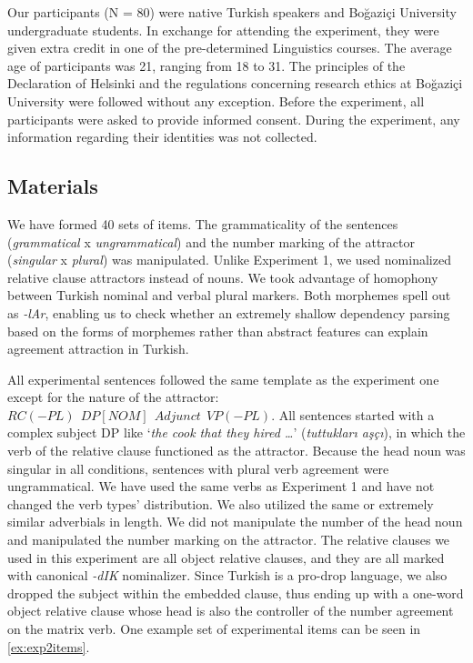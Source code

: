Our participants (N = 80) were native Turkish speakers and Bo\u{g}azi\c{c}i University undergraduate students. In exchange for attending the experiment, they were given extra credit in one of the pre-determined Linguistics courses. The average age of participants was 21, ranging from 18 to 31. The principles of the Declaration of Helsinki and the regulations concerning research ethics at Bo\u{g}azi\c{c}i University were followed without any exception. Before the experiment, all participants were asked to provide informed consent. During the experiment, any information regarding their identities was not collected. 


\subsection{Materials}

We have formed 40 sets of items. The grammaticality of the sentences (\textit{grammatical} x \textit{ungrammatical}) and the number marking of the attractor (\textit{singular} x \textit{plural}) was manipulated. Unlike Experiment 1, we used nominalized relative clause attractors instead of nouns. We took advantage of homophony between Turkish nominal and verbal plural markers. Both morphemes spell out as \textit{-lAr}, enabling us to check whether an extremely shallow dependency parsing based on the forms of morphemes rather than abstract features can explain agreement attraction in Turkish.

All experimental sentences followed the same template as the experiment one except for the nature of the attractor: $RC(-PL){\ }{\ }DP[NOM]{\ }{\ }Adjunct{\ }{\ }VP(-PL)$. All sentences started with a complex subject DP like `\textit{the cook that they hired \ldots{}}' (\textit{tuttuklar{\i} a\c{s}\c{c}{\i}}), in which the verb of the relative clause functioned as the attractor. Because the head noun was singular in all conditions, sentences with plural verb agreement were ungrammatical. We have used the same verbs as Experiment 1 and have not changed the verb types' distribution. We also utilized the same or extremely similar adverbials in length. We did not manipulate the number of the head noun and manipulated the number marking on the attractor. The relative clauses we used in this experiment are all object relative clauses, and they are all marked with canonical \textit{-dIK} nominalizer. Since Turkish is a pro-drop language, we also dropped the subject within the embedded clause, thus ending up with a one-word object relative clause whose head is also the controller of the number agreement on the matrix verb. One example set of experimental items can be seen in \ref{ex:exp2items}.

